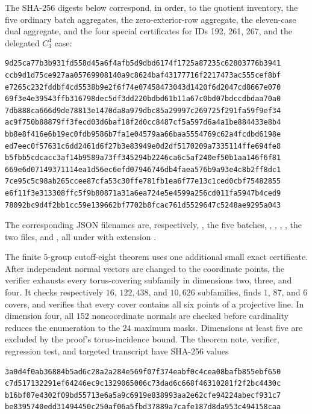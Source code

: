 The SHA-256 digests below correspond, in order, to the quotient inventory,
the five ordinary batch aggregates, the zero-exterior-row aggregate, the
eleven-case dual aggregate, and the four special certificates for IDs 192,
261, 267, and the delegated $C_3^4$ case:
\begin{verbatim}
9d25ca77b3b931fd558d45a6f4afb5d9dbd6174f1725a87235c62803776b3941
ccb9d1d75ce927aa05769908140a9c8624baf43177716f2217473ac555cef8bf
e7265c232fddbf4cd5538b9e2f6f74e07458473043d1420f6d2047cd8667e070
69f3e4e39543ffb316798dec5df3dd220bdbd61b11a67c0bd07bdccdbdaa70a0
7db888ca666d9de78813e1470da8a979dbc85a29997c269725f291fa59f9ef34
ac9f750b88879ff3fecd03d6baf18f2d0cc8487cf5a597d6a4a1be884433e8b4
bb8e8f416e6b19ec0fdb9586b7fa1e04579aa66baa5554769c62a4fcdbd6198e
ed7eec0f57631c6dd2461d6f27b3e83949e0d2df5170209a7335114ffe694fe8
b5fbb5cdcacc3af14b9589a73ff345294b2246ca6c5af240ef50b1aa146f6f81
669e6d07149371114ea1d56ec6efd07946746db4faea576b9a93e4c8b2ff8dc1
7ce95c5c98ab265ccee87cfa53c30ffe781fb1ea6f77e13c1ced0cbf75482855
e6f11f3e313308ffc5f9b80871a31a6ea724e5e4599a256cd011fa5947b4ced9
78092bc9d4f2bb1cc59e139662bf7702b8fcac761d5529647c5248ae9295a043
\end{verbatim}
The corresponding JSON filenames are, respectively,
, the five  batches,
, ,
, , the two
 files, and , all under
 with extension .

The finite \(5\)-group cutoff-eight theorem uses one additional small exact
certificate.  After independent normal vectors are changed to the coordinate
points, the verifier exhausts every torus-covering subfamily in dimensions
two, three, and four.  It checks respectively \(16\), \(122{,}438\), and
\(10{,}626\) subfamilies, finds \(1\), \(87\), and \(6\) covers, and verifies
that every cover contains all six points of a projective line.  In dimension
four, all \(152\) noncoordinate normals are checked before cardinality
reduces the enumeration to the \(24\) maximum masks.  Dimensions at least
five are excluded by the proof's torus-incidence bound.  The theorem note,
verifier, regression test, and targeted transcript have SHA-256 values
\begin{verbatim}
3a0d4f0ab36884b5ad6c28a2a284e569f07f374eabf0c4cea08bafb855ebf650
c7d517132291ef64246ec9c1329065006c73dad6c668f46310281f2f2bc4430c
b16bf07e4302f09bd55713e6a5a9c6919e838993aa2e62cfe94224abecf931c7
be8395740edd31494450c250af06a5fbd37889a7cafe187d8da953c494158caa
\end{verbatim}

